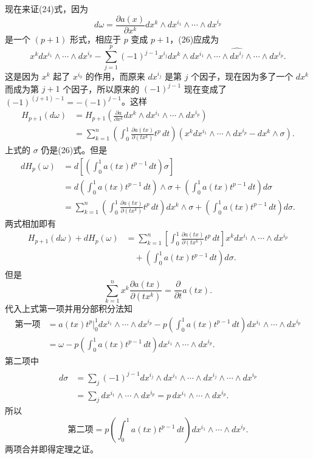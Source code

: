 现在来证(24)式，因为
\[
 d\omega=\frac{\partial a(x)}{\partial x^k}dx^k\wedge dx^{i_1}\wedge\cdots\wedge dx^{i_p}
\]
是一个 $(p+1)$ 形式，相应于 $p$ 变成 $p+1$，(26)应成为
\[
 x^kdx^{i_1}\wedge\cdots\wedge dx^{i_p}
 -\sum_{j=1}^p(-1)^{j-1}x^{i_j}dx^k\wedge dx^{i_1}\wedge\cdots\wedge\widehat{dx^{i_j}}\wedge\cdots\wedge dx^{i_p}.
\]
这是因为 $x^k$ 起了 $x^{i_0}$ 的作用，而原来 $dx^{i_j}$ 是第 $j$ 个因子，现在因为多了一个 $dx^k$ 而成为第 $j+1$ 个因子，所以原来的 $(-1)^{j-1}$ 现在变成了 $(-1)^{(j+1)-1}=-(-1)^{j-1}$。这样
\begin{align*}
 H_{p+1}(d\omega)
 &=H_{p+1}\left(\frac{\partial a}{\partial x^k}dx^k\wedge dx^{i_1}\wedge\cdots\wedge dx^{i_p}\right)\\
 &=\sum_{k=1}^n\left(\int_0^1\frac{\partial a(tx)}{\partial(tx^k)}t^p\,dt\right)
 \left(x^kdx^{i_1}\wedge\cdots\wedge dx^{i_p}-dx^k\wedge\sigma\right).
\end{align*}
上式的 $\sigma$ 仍是(26)式。但是
\begin{align*}
 dH_p(\omega)
 &=d\left[\left(\int_0^1a(tx)t^{p-1}\,dt\right)\sigma\right]\\
 &=d\left(\int_0^1a(tx)t^{p-1}\,dt\right)\wedge\sigma
 +\left(\int_0^1a(tx)t^{p-1}\,dt\right)d\sigma\\
 &=\sum_{k=1}^n\left(\int_0^1\frac{\partial a(tx)}{\partial(tx^k)}t^p\,dt\right)dx^k\wedge\sigma
 +\left(\int_0^1a(tx)t^{p-1}\,dt\right)d\sigma.
\end{align*}
两式相加即有
\[
\begin{aligned}
 H_{p+1}(d\omega)+dH_p(\omega)
 &=\sum_{k=1}^n\left[\int_0^1\frac{\partial a(tx)}{\partial(tx^k)}t^p\,dt\right]x^k
 dx^{i_1}\wedge\cdots\wedge dx^{i_p}\\
 &\quad+\left(\int_0^1a(tx)t^{p-1}\,dt\right)d\sigma.
\end{aligned}
\]
但是
\[
 \sum_{k=1}^n x^k\frac{\partial a(tx)}{\partial(tx^k)}=\frac{\partial}{\partial t}a(tx).
\]
代入上式第一项并用分部积分法知
\begin{align*}
 \text{第一项}
 &=\left.a(tx)t^p\right|_0^1dx^{i_1}\wedge\cdots\wedge dx^{i_p}
 -p\left(\int_0^1a(tx)t^{p-1}\,dt\right)dx^{i_1}\wedge\cdots\wedge dx^{i_p}\\
 &=\omega-p\left(\int_0^1a(tx)t^{p-1}\,dt\right)dx^{i_1}\wedge\cdots\wedge dx^{i_p}.
\end{align*}
第二项中
\[
\begin{aligned}
 d\sigma
 &=\sum_j(-1)^{j-1}dx^{i_j}\wedge dx^{i_1}\wedge\cdots\wedge
 \widehat{dx^{i_j}}\wedge\cdots\wedge dx^{i_p}\\
 &=\sum_j dx^{i_1}\wedge\cdots\wedge dx^{i_p}
 =p\,dx^{i_1}\wedge\cdots\wedge dx^{i_p}.
\end{aligned}
\]
所以
\[
 \text{第二项}=p\left(\int_0^1a(tx)t^{p-1}\,dt\right)dx^{i_1}\wedge\cdots\wedge dx^{i_p}.
\]
两项合并即得定理之证。

